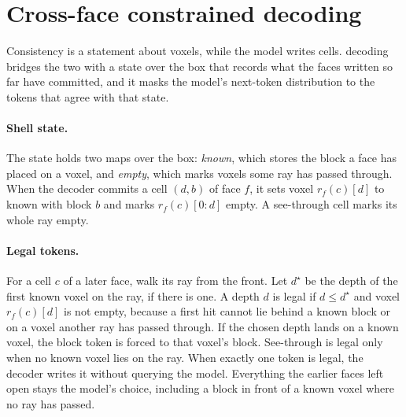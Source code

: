 \section{Cross-face constrained decoding}
\label{sec:method}

Consistency is a statement about voxels, while the model writes cells. \cfd{} decoding bridges the
two with a state over the box that records what the faces written so far have committed, and it
masks the model's next-token distribution to the tokens that agree with that state.

\paragraph{Shell state.}
The state holds two maps over the box: \emph{known}, which stores the block a face has placed on a
voxel, and \emph{empty}, which marks voxels some ray has passed through. When the decoder commits a
cell $(d,b)$ of face $f$, it sets voxel $r_f(c)[d]$ to known with block $b$ and marks $r_f(c)[0{:}d]$
empty. A see-through cell marks its whole ray empty.

\paragraph{Legal tokens.}
For a cell $c$ of a later face, walk its ray from the front. Let $d^\star$ be the depth of the first
known voxel on the ray, if there is one. A depth $d$ is legal if $d \le d^\star$ and voxel
$r_f(c)[d]$ is not empty, because a first hit cannot lie behind a known block or on a voxel another
ray has passed through. If the chosen depth lands on a known voxel, the block token is forced to that
voxel's block. See-through is legal only when no known voxel lies on the ray. When exactly one token is
legal, the decoder writes it without querying the model. Everything the earlier faces left open stays
the model's choice, including a block in front of a known voxel where no ray has passed.

